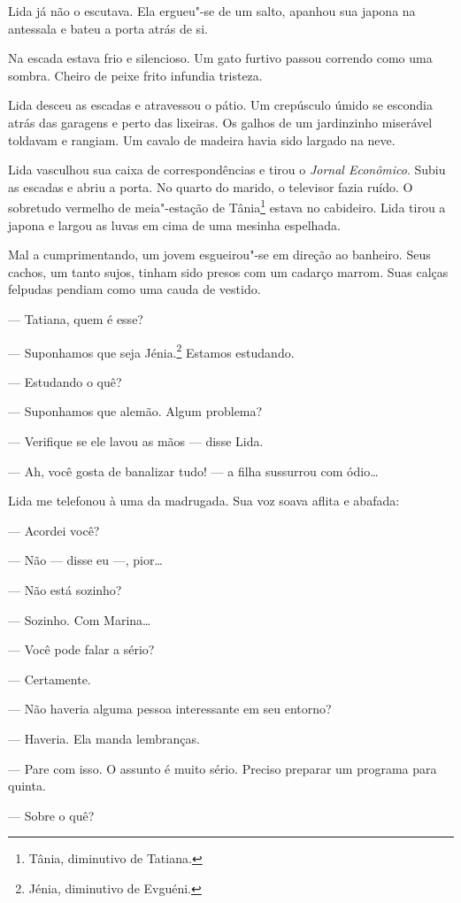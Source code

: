 Lida já não o escutava. Ela ergueu"-se de um salto, apanhou sua japona na
antessala e bateu a porta atrás de si.

Na escada estava frio e silencioso. Um gato furtivo passou correndo como
uma sombra. Cheiro de peixe frito infundia tristeza.

Lida desceu as escadas e atravessou o pátio. Um crepúsculo úmido se
escondia atrás das garagens e perto das lixeiras. Os galhos de um
jardinzinho miserável toldavam e rangiam. Um cavalo de madeira havia
sido largado na neve.

Lida vasculhou sua caixa de correspondências e tirou o \emph{Jornal Econômico}. Subiu
as escadas e abriu a porta. No quarto do marido, o televisor fazia
ruído. O sobretudo vermelho de meia"-estação de Tânia\footnote{Tânia,
  diminutivo de Tatiana.} estava no cabideiro. Lida tirou a japona e
largou as luvas em cima de uma mesinha espelhada.

Mal a cumprimentando, um jovem esgueirou"-se em direção ao banheiro. Seus
cachos, um tanto sujos, tinham sido presos com um cadarço marrom. Suas calças felpudas pendiam como uma cauda de vestido.

--- Tatiana, quem é esse?

--- Suponhamos que seja Jénia.\footnote{Jénia, diminutivo de Evguéni.}
Estamos estudando.

--- Estudando o quê?

--- Suponhamos que alemão. Algum problema?

--- Verifique se ele lavou as mãos --- disse Lida.

--- Ah, você gosta de banalizar tudo! --- a filha sussurrou com ódio\ldots{}

Lida me telefonou à uma da madrugada. Sua voz soava aflita e abafada:

--- Acordei você?

--- Não --- disse eu ---, pior\ldots{}

--- Não está sozinho?

--- Sozinho. Com Marina\ldots{}

--- Você pode falar a sério?

--- Certamente.

--- Não haveria alguma pessoa interessante em seu entorno?

--- Haveria. Ela manda lembranças.

--- Pare com isso. O assunto é muito sério. Preciso preparar um programa
para quinta.

--- Sobre o quê?

